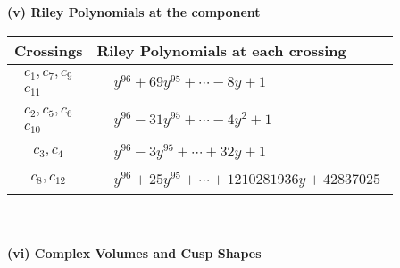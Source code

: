 \documentclass[1p]{elsarticle_modified}
\theoremstyle{definition}
\begin{document}
\newpage\renewcommand{\arraystretch}{1}
\flushleft \textbf{(v) Riley Polynomials at the component}\newline \\
\begin{tabular}{m{50pt}|m{274pt}}
Crossings & \hspace{64pt}Riley Polynomials at each crossing \\
\hline $$\begin{aligned}c_{1},c_{7},c_{9}\\c_{11}\end{aligned}$$&$\begin{aligned}
&y^{96}+69 y^{95}+\cdots-8 y+1
\end{aligned}$\\
\hline $$\begin{aligned}c_{2},c_{5},c_{6}\\c_{10}\end{aligned}$$&$\begin{aligned}
&y^{96}-31 y^{95}+\cdots-4 y^2+1
\end{aligned}$\\
\hline $$\begin{aligned}c_{3},c_{4}\end{aligned}$$&$\begin{aligned}
&y^{96}-3 y^{95}+\cdots+32 y+1
\end{aligned}$\\
\hline $$\begin{aligned}c_{8},c_{12}\end{aligned}$$&$\begin{aligned}
&y^{96}+25 y^{95}+\cdots+1210281936 y+42837025
\end{aligned}$\\
\hline
\end{tabular}\\~\\
\newpage\flushleft \textbf{(vi) Complex Volumes and Cusp Shapes}
\end{document}
